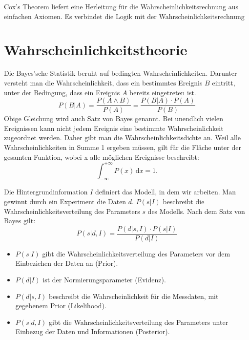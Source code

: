 \documentclass[]{dsadokumentation}
\begin{document}
                                                                                  
Cox's Theorem liefert eine Herleitung für die Wahrscheinlichkeitsrechnung aus einfachen Axiomen. Es verbindet die Logik mit der Wahrscheinlichkeitsrechnung

\section{Wahrscheinlichkeitstheorie}

Die Bayes'sche Statistik beruht auf bedingten Wahrscheinlichkeiten. Darunter versteht man die Wahrscheinlichkeit, dass ein bestimmtes Ereignis $B$ eintritt, unter der Bedingung, dass ein Ereignis $A$ bereits eingetreten ist.
\begin{displaymath}
P(B|A) = \frac{P(A \wedge B)}{P(A)} = \frac{P(B|A)\cdot P(A)}{P(B)}
\end{displaymath}
Obige Gleichung wird auch Satz von Bayes genannt. Bei unendlich vielen Ereignissen kann nicht jedem Ereignis eine bestimmte Wahrscheinlichkeit zugeordnet werden. Daher gibt man die Wahrscheinlichkeitsdichte an. Weil alle Wahrscheinlichkeiten in Summe 1 ergeben müssen, gilt für die Fläche unter der gesamten Funktion, wobei x alle möglichen Ereignisse beschreibt:
\begin{displaymath}
\int_{- \infty }^ {+ \infty} P(x) \,\mbox{d}x = 1.
\end{displaymath}

 Die Hintergrundinformation $I$ definiert das Modell, in dem wir arbeiten. Man gewinnt durch ein Experiment die Daten $d$. $P(s|I)$ beschreibt die Wahrscheinlichkeitsverteilung des Parameters $s$ des Modells. Nach dem Satz von Bayes gilt:
\begin{displaymath}
P(s|d,I) = \frac{P(d|s,I)\cdot P(s|I)}{P(d|I)}
\end{displaymath}

\begin{itemize}
 \item $P(s|I)$ gibt die Wahrscheinlichkeitsverteilung des Parameters vor dem Einbeziehen der Daten an (Prior).
 \item $P(d|I)$ ist der Normierungsparameter (Evidenz).
 \item $P(d|s,I)$ beschreibt die Wahrscheinlichkeit für die Messdaten, mit gegebenem Prior (Likelihood).
 \item $P(s|d,I)$ gibt die Wahrscheinlichkeitsverteilung des Parameters unter Einbezug der Daten und Informationen (Posterior).
\end{itemize}
\end{document}
